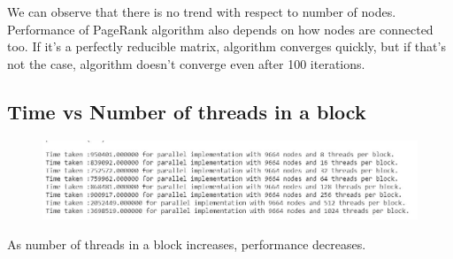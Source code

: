 \documentclass[a4paper]{article}
\begin{document}
We can observe that there is no trend with respect to number of nodes. Performance of PageRank algorithm also depends on how nodes are connected too. If it's a perfectly reducible matrix, algorithm converges quickly, but if that's not the case, algorithm doesn't converge even after 100 iterations.

\subsection{Time vs Number of threads in a block}
\begin{figure}[h]
    \begin{center}
    \includegraphics[width=1\textwidth]{PageRank/img/Capture8.JPG}
    \end{center}
\end{figure}
As number of threads in a block increases, performance decreases.
\end{document}
